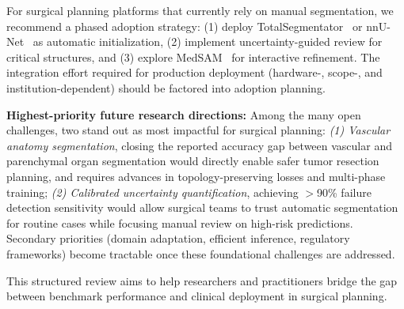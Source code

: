 For surgical planning platforms that currently rely on manual segmentation, we recommend a phased adoption strategy: (1) deploy TotalSegmentator~\cite{wasserthal2023totalsegmentator} or nnU-Net~\cite{isensee2021nnunet} as automatic initialization, (2) implement uncertainty-guided review for critical structures, and (3) explore MedSAM~\cite{ma2024medsam} for interactive refinement. The integration effort required for production deployment (hardware-, scope-, and institution-dependent) should be factored into adoption planning.

\textbf{Highest-priority future research directions:} Among the many open challenges, two stand out as most impactful for surgical planning: \emph{(1) Vascular anatomy segmentation}, closing the reported accuracy gap between vascular and parenchymal organ segmentation would directly enable safer tumor resection planning, and requires advances in topology-preserving losses and multi-phase training; \emph{(2) Calibrated uncertainty quantification}, achieving $>$90\% failure detection sensitivity would allow surgical teams to trust automatic segmentation for routine cases while focusing manual review on high-risk predictions. Secondary priorities (domain adaptation, efficient inference, regulatory frameworks) become tractable once these foundational challenges are addressed.

This structured review aims to help researchers and practitioners bridge the gap between benchmark performance and clinical deployment in surgical planning.




